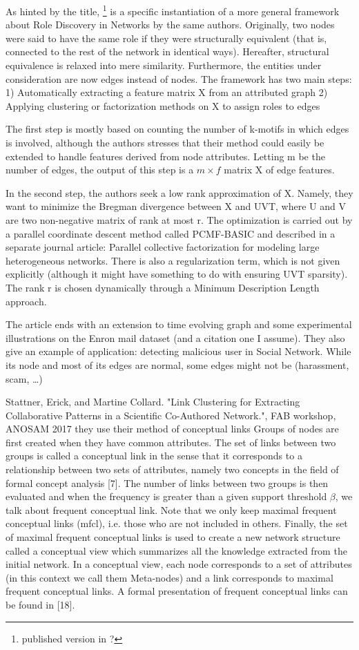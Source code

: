 As hinted by the title, \autocite{Ahmed2016}\footnote{published version in
\autocite{ahmed2017roles}?} is a specific instantiation of a more general framework
about Role Discovery in Networks by the same authors. Originally, two nodes were said to have the
same role if they were structurally equivalent (that is, connected to the rest of the network in
identical ways). Hereafter, structural equivalence is relaxed into mere similarity. Furthermore, the
entities under consideration are now edges instead of nodes.
The framework has two main steps:
1) Automatically extracting a feature matrix X from an attributed graph
2) Applying clustering or factorization methods on X to assign roles to edges

The first step is mostly based on counting the number of k-motifs in which edges is involved,
although the authors stresses that their method could easily be extended to handle features derived
from node attributes. Letting m be the number of edges, the output of this step is a $m\times f$
matrix X of edge features.

In the second step, the authors seek a low rank approximation of X. Namely, they
want to minimize the Bregman divergence between X and UVT, where U and V are
two non-negative matrix of rank at most r. The optimization is carried out by a
parallel coordinate descent method called PCMF-BASIC and described in a separate
journal article: Parallel collective factorization for modeling large heterogeneous
networks.
There is also a regularization term, which is not given explicitly (although it
might have something to do with ensuring UVT sparsity). The rank r is chosen
dynamically through a Minimum Description Length approach.

The article ends with an extension to time evolving graph and some experimental
illustrations on the Enron mail dataset (and a citation one I assume). They also
give an example of application: detecting malicious user in Social Network. While its
node and most of its edges are normal, some edges might not be (harassment,
scam, …)

Stattner, Erick, and Martine Collard. "Link Clustering for Extracting Collaborative Patterns in a Scientific Co-Authored Network.", FAB workshop, ANOSAM 2017
they use their method of conceptual links
Groups of nodes are first created when they have common attributes. The set of links between two
groups is called a conceptual link in the sense that it corresponds to a relationship between two
sets of attributes, namely two concepts in the field of formal concept analysis [7]. The number of
links between two groups is then evaluated and when the frequency is greater than a given support
threshold $\beta$, we talk about frequent conceptual link. Note that we only keep maximal frequent conceptual links (mfcl), i.e. those who are not included in others.
Finally, the set of maximal frequent conceptual links is used to create a new network structure called a conceptual view which summarizes all the knowledge extracted from the initial network. In a conceptual view, each node corresponds to a set of attributes (in this context we call them Meta-nodes) and a link corresponds to maximal frequent conceptual links.
A formal presentation of frequent conceptual links can be found in [18].

